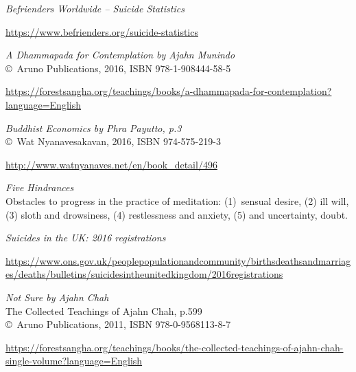 \begin{thebibliography}{9}

 \emph{Befrienders Worldwide -- Suicide Statistics}
  
  {\footnotesize \url{https://www.befrienders.org/suicide-statistics}}

 \emph{A Dhammapada for Contemplation by Ajahn Munindo}\\
  \copyright\ Aruno Publications, 2016, ISBN 978-1-908444-58-5

  {\footnotesize \url{https://forestsangha.org/teachings/books/a-dhammapada-for-contemplation?language=English}}

 \emph{Buddhist Economics by Phra Payutto, p.3}\\
  \copyright\ Wat Nyanavesakavan, 2016, ISBN 974-575-219-3

  {\footnotesize \url{http://www.watnyanaves.net/en/book_detail/496}}

\clearpage

 \emph{Five Hindrances}\\
  Obstacles to progress in the practice of meditation: (1)~sensual desire, (2)
  ill will, (3) sloth and drowsiness, (4) restlessness and anxiety, (5) and
  uncertainty, doubt.

\enlargethispage{\baselineskip}
  
 \emph{Suicides in the UK: 2016 registrations}

  {\footnotesize \url{https://www.ons.gov.uk/peoplepopulationandcommunity/birthsdeathsandmarriages/deaths/bulletins/suicidesintheunitedkingdom/2016registrations}}

 \emph{Not Sure by Ajahn Chah}\\
  The Collected Teachings of Ajahn Chah, p.599\\
  \copyright\ Aruno Publications, 2011, ISBN 978-0-9568113-8-7

  {\footnotesize \url{https://forestsangha.org/teachings/books/the-collected-teachings-of-ajahn-chah-single-volume?language=English}}

\end{thebibliography}
